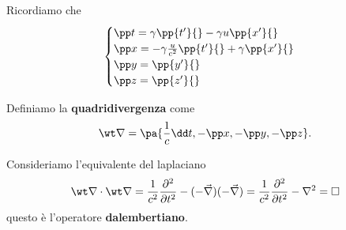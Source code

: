 Ricordiamo che
\[\begin{cases}
\pp t{}=\gamma\pp{t'}{}-\gamma u\pp{x'}{}\\
\pp x{}=-\gamma \frac{u}{c^2}\pp{t'}{}+\gamma \pp{x'}{}\\
\pp y{}=\pp {y'}{}\\
\pp z{}=\pp {z'}{}
\end{cases}\]

\begin{definition}[Quadrigradiente]
Definiamo la \textbf{quadridivergenza} come
\[\wt \nabla=\pa{\frac1c\dd t{},-\pp x{},-\pp y{},-\pp z{}}.\]
\end{definition}

\begin{remark}
Consideriamo l'equivalente del laplaciano
\[\wt \nabla\cdot\wt\nabla=\frac1{c^2}\pps[2]t{}-(-\vec\nabla)(-\vec \nabla)=\frac1{c^2}\pps[2]t{}-\nabla^2=\square\]
questo \`e l'operatore \textbf{dalembertiano}.
\end{remark}

